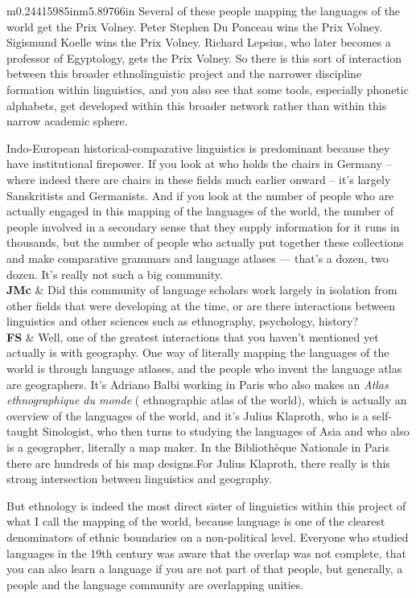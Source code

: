 \documentclass[12pt]{article}
\begin{document}
\begin{flushleft}
\begin{supertabular}{m{0.24415985in}m{5.89766in}}
Several of these people mapping the languages of the world get the Prix Volney. Peter Stephen Du Ponceau wins the Prix Volney. Sigismund Koelle wins the Prix Volney. Richard Lepsius, who later becomes a professor of Egyptology, gets the Prix Volney. So there is this sort of interaction between this broader ethnolinguistic project and the narrower discipline formation within linguistics, and you also see that some tools, especially phonetic alphabets, get developed within this broader network rather than within this narrow academic sphere. 

Indo-European historical-comparative linguistics is predominant because they have institutional firepower. If you look at who holds the chairs in Germany – where indeed there are chairs in these fields much earlier onward – it’s largely Sanskritists and Germanists. And if you look at the number of people who are actually engaged in this mapping of the languages of the world, the number of people involved in a secondary sense that they supply information for it runs in thousands, but the number of people who actually put together these collections and make comparative grammars and language atlases — that’s a dozen, two dozen. It’s really not such a big community.\\
\textbf{JMc}\newline
 &
Did this community of language scholars work largely in isolation from other fields that were developing at the time, or are there interactions between linguistics and other sciences such as ethnography, psychology, history?\\
\textbf{FS}\newline
 &
Well, one of the greatest interactions that you haven’t mentioned yet actually is with geography. One way of literally mapping the languages of the world is through language atlases, and the people who invent the language atlas are geographers. It’s Adriano Balbi working in Paris who also makes an \textit{Atlas ethnographique du monde} ( ethnographic atlas of the world), which is actually an overview of the languages of the world, and it’s Julius Klaproth, who is a self-taught Sinologist, who then turns to studying the languages of Asia and who also is a geographer, literally a map maker. In the Bibliothèque Nationale in Paris there are hundreds of his map designs.For Julius Klaproth, there really is this strong intersection between linguistics and geography. 

But ethnology is indeed the most direct sister of linguistics within this project of what I call the mapping of the world, because language is one of the clearest denominators of ethnic boundaries on a non-political level. Everyone who studied languages in the 19th century was aware that the overlap was not complete, that you can also learn a language if you are not part of that people, but generally, a people and the language community are overlapping unities. 


\end{supertabular}
\end{flushleft}
\end{document}
